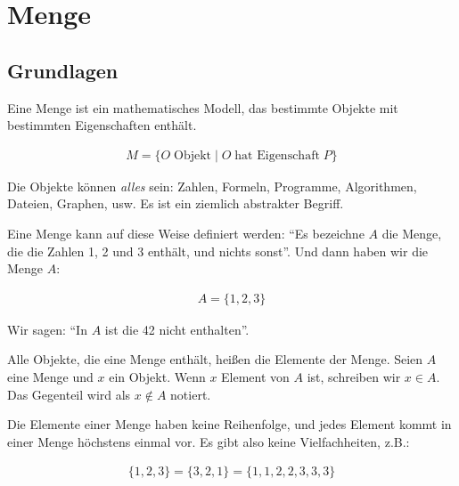 \documentclass[12pt,a4paper,oneside]{article}
\newcommand{\afz}[1]{\enquote{#1}}
\newcommand{\emptyline}{\hspace*{\fill}}
\begin{document}
    \section{Menge}

        \subsection{Grundlagen}

            Eine Menge ist ein mathematisches Modell, das bestimmte Objekte mit bestimmten Eigenschaften enthält.

            \vspace{-1em}
            \begin{align*}
                M = \{O \;\text{Objekt} \;|\; O \;\text{hat Eigenschaft}\; P\}
            \end{align*}

            Die Objekte können \textit{alles} sein: Zahlen, Formeln, Programme, Algorithmen, Dateien, Graphen, usw.
            Es ist ein ziemlich abstrakter Begriff.

            \emptyline

            Eine Menge kann auf diese Weise definiert werden:
            \afz{Es bezeichne $A$ die Menge, die die Zahlen 1, 2 und 3 enthält, und nichts sonst}.
            Und dann haben wir die Menge $A$:

            \vspace{-1em}
            \begin{align*}
                A = \{1, 2, 3\}
            \end{align*}

            Wir sagen: \afz{In $A$ ist die 42 nicht enthalten}.

            \emptyline

            Alle Objekte, die eine Menge enthält, heißen die Elemente der Menge.
            Seien $A$ eine Menge und $x$ ein Objekt.
            Wenn $x$ Element von $A$ ist, schreiben wir $x \in A$.
            Das Gegenteil wird als $x \notin A$ notiert.

            \emptyline

            Die Elemente einer Menge haben keine Reihenfolge,
            und jedes Element kommt in einer Menge höchstens einmal vor.
            Es gibt also keine Vielfachheiten, z.B.:

            \vspace{-1em}
            \begin{align*}
                \{1, 2, 3\} = \{3, 2, 1\} = \{1, 1, 2, 2, 3, 3, 3\}
            \end{align*}
\end{document}
